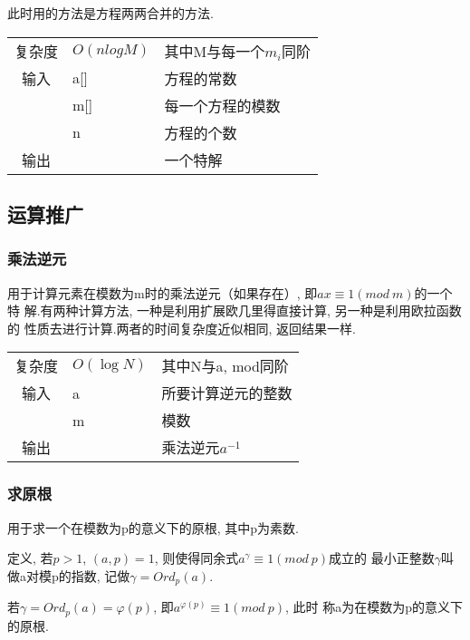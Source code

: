 此时用的方法是方程两两合并的方法.
\begin{longtable}{|c|l|l|}
复杂度 & $O(nlogM)$ & 其中M与每一个$m_i$同阶 \\
输入 & a[] & 方程的常数 \\
 & m[] & 每一个方程的模数 \\
 & n & 方程的个数 \\
输出 & & 一个特解 \\
\end{longtable}



    \subsection{运算推广}\small


        \subsubsection{乘法逆元}\small
用于计算元素在模数为m时的乘法逆元（如果存在）, 即$ax \equiv 1(mod\ m)$的一个特
解.有两种计算方法, 一种是利用扩展欧几里得直接计算, 另一种是利用欧拉函数的
性质去进行计算.两者的时间复杂度近似相同, 返回结果一样.
\begin{longtable}{|c|l|l|}
复杂度 & $O(\log N)$ & 其中N与a, mod同阶  \\
输入 & a & 所要计算逆元的整数 \\
 & m & 模数 \\
输出 &  & 乘法逆元$a^{-1}$ \\
\end{longtable}



        \subsubsection{求原根}\small
用于求一个在模数为p的意义下的原根, 其中p为素数.

定义, 若$p > 1$, $(a, p) = 1$, 则使得同余式$a^{\gamma} \equiv 1(mod\ p)$成立的
最小正整数$\gamma$叫做a对模p的指数, 记做$\gamma = Ord_{p}(a)$.

若$\gamma = Ord_{p}(a) = \varphi(p)$, 即$a^{\varphi(p)} \equiv 1(mod\ p)$, 此时
称a为在模数为p的意义下的原根.

